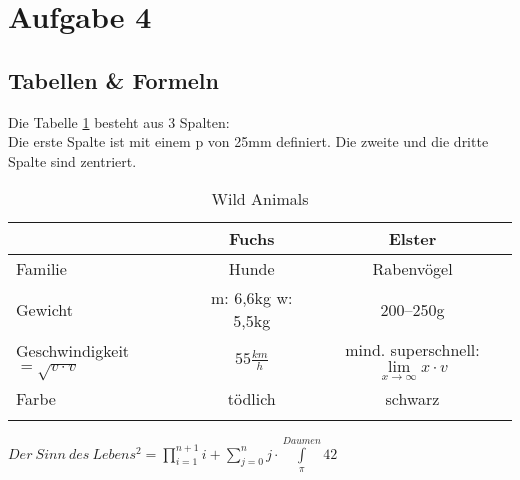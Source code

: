
\section{Aufgabe 4}
\subsection{Tabellen \& Formeln}
Die Tabelle \ref{tab:ani} besteht aus 3 Spalten:\\
Die erste Spalte ist mit einem p von 25mm definiert. Die zweite und die dritte Spalte sind zentriert.

\begin{longtable}{p{25mm}|c|c}
& Fuchs & Elster\\
\hline
\hline
Familie & Hunde & Rabenvögel\\
\hline
Gewicht & m: 6,6kg w: 5,5kg & 200--250g\\
\hline
Geschwindigkeit $ = \sqrt{v\cdot v}$ & $55\frac{km}{h}$ & mind. superschnell: $\lim\limits_{x \rightarrow \infty} x \cdot v$ \\
\hline
Farbe & tödlich & schwarz\\
\hline
\caption{Wild Animals}
\label{tab:ani}
\end{longtable}

$Der~Sinn~des~Lebens^2 = \prod\limits_{i=1}^{n+1} i + \sum_{j=0}^{n} j \cdot \int\limits_{\pi}^{Daumen} 42$

